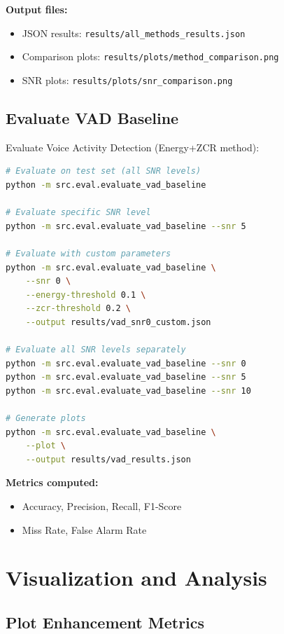 \documentclass[12pt,a4paper]{article}
\begin{document}
\textbf{Output files:}
\begin{itemize}
    \item JSON results: \texttt{results/all\_methods\_results.json}
    \item Comparison plots: \texttt{results/plots/method\_comparison.png}
    \item SNR plots: \texttt{results/plots/snr\_comparison.png}
\end{itemize}

\subsection{Evaluate VAD Baseline}

Evaluate Voice Activity Detection (Energy+ZCR method):

\begin{lstlisting}[language=bash]
# Evaluate on test set (all SNR levels)
python -m src.eval.evaluate_vad_baseline

# Evaluate specific SNR level
python -m src.eval.evaluate_vad_baseline --snr 5

# Evaluate with custom parameters
python -m src.eval.evaluate_vad_baseline \
    --snr 0 \
    --energy-threshold 0.1 \
    --zcr-threshold 0.2 \
    --output results/vad_snr0_custom.json

# Evaluate all SNR levels separately
python -m src.eval.evaluate_vad_baseline --snr 0
python -m src.eval.evaluate_vad_baseline --snr 5
python -m src.eval.evaluate_vad_baseline --snr 10

# Generate plots
python -m src.eval.evaluate_vad_baseline \
    --plot \
    --output results/vad_results.json
\end{lstlisting}

\textbf{Metrics computed:}
\begin{itemize}
    \item Accuracy, Precision, Recall, F1-Score
    \item Miss Rate, False Alarm Rate
\end{itemize}

\section{Visualization and Analysis}

\subsection{Plot Enhancement Metrics}
\end{document}
